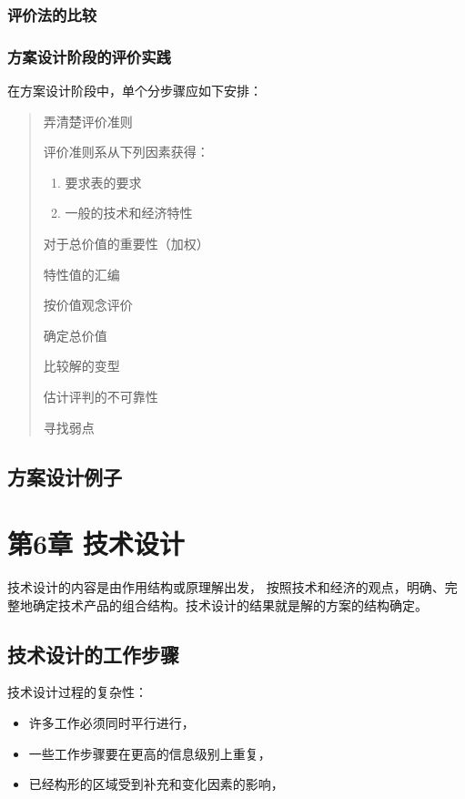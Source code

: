 \documentclass[letterpaper,10pt,english]{sphinxmanual}
\begin{document}
\subsection{评价法的比较}
\label{unit5:id24}

\subsection{方案设计阶段的评价实践}
\label{unit5:id25}
在方案设计阶段中，单个分步骤应如下安排：
\begin{quote}

弄清楚评价准则

评价准则系从下列因素获得：
\begin{enumerate}
\item {} 
要求表的要求

\item {} 
一般的技术和经济特性

\end{enumerate}

对于总价值的重要性（加权）

特性值的汇编

按价值观念评价

确定总价值

比较解的变型

估计评判的不可靠性

寻找弱点
\end{quote}


\section{方案设计例子}
\label{unit5:id26}

\chapter{第6章 技术设计}
\label{unit6::doc}\label{unit6:id1}
技术设计的内容是由作用结构或原理解出发，
按照技术和经济的观点，明确、完整地确定技术产品的组合结构。技术设计的结果就是解的方案的结构确定。


\section{技术设计的工作步骤}
\label{unit6:id2}
技术设计过程的复杂性：
\begin{itemize}
\item {} 
许多工作必须同时平行进行，

\item {} 
一些工作步骤要在更高的信息级别上重复，

\item {} 
已经构形的区域受到补充和变化因素的影响，

\end{itemize}
\end{document}

